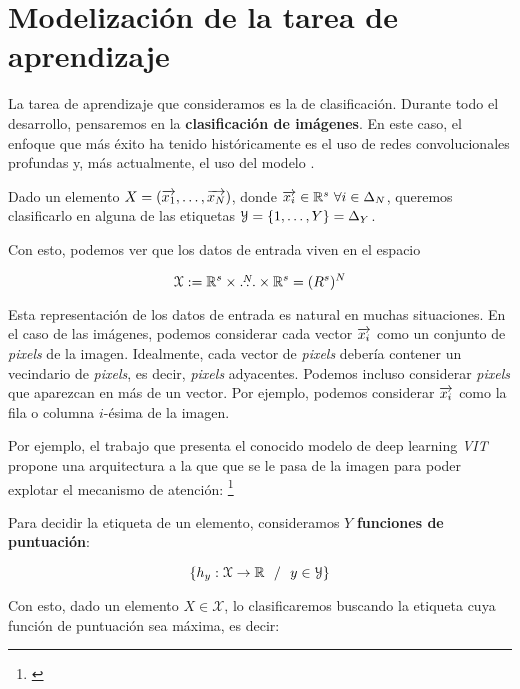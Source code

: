 \chapter{Modelización de la tarea de aprendizaje} \label{ch:tarea_aprendizaje}

La tarea de aprendizaje que consideramos es la de clasificación. Durante todo el desarrollo, pensaremos en la \textbf{clasificación de imágenes}. En este caso, el enfoque que más éxito ha tenido históricamente es el uso de redes convolucionales profundas y, más actualmente, el uso del modelo .

Dado un elemento $X = (\overrightarrow{x_1}, \ldots, \overrightarrow{x_N})$, donde $\nv{x_i} \in \R^s \ \forall i \in \deltaset{N}$, queremos clasificarlo en alguna de las etiquetas $\mathcal{Y} = \{1, \ldots, Y \} = \Delta_{Y}$.

Con esto, podemos ver que los datos de entrada viven en el espacio

$$\mathcal{X} := \mathbb{R}^s \times \overset{N}{\ldots} \times \mathbb{R}^s = (R^s)^N$$

Esta representación de los datos de entrada es natural en muchas situaciones. En el caso de las imágenes, podemos considerar cada vector $\overrightarrow{x_i}$ como un conjunto de \textit{pixels} de la imagen. Idealmente, cada vector de \textit{pixels} debería contener un vecindario de \textit{pixels}, es decir, \textit{pixels} adyacentes. Podemos incluso considerar \textit{pixels} que aparezcan en más de un vector. Por ejemplo, podemos considerar $\overrightarrow{x_i}$ como la fila o columna $i$-ésima de la imagen.

Por ejemplo, el trabajo que presenta el conocido modelo  de deep learning \textit{VIT} propone una arquitectura  a la que que se le pasa  de la imagen para poder explotar el mecanismo de atención:  \footnote{\cite{matematicas:vit}}

Para decidir la etiqueta de un elemento, consideramos $Y$ \textbf{funciones de puntuación}:

$$\{h_y: \mathcal{X} \to \mathbb{R} \ \  / \ \  y \in \mathcal{Y} \}$$

Con esto, dado un elemento $X \in \mathcal{X}$, lo clasificaremos buscando la etiqueta cuya función de puntuación sea máxima, es decir:

